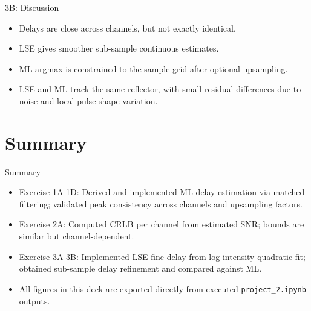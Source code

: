 \documentclass[aspectratio=169,10pt]{beamer}
\begin{document}
\begin{frame}{3B: Discussion}
\begin{itemize}
\item Delays are close across channels, but not exactly identical.
\item LSE gives smoother sub-sample continuous estimates.
\item ML argmax is constrained to the sample grid after optional upsampling.
\item LSE and ML track the same reflector, with small residual differences due to noise and local pulse-shape variation.
\end{itemize}
\end{frame}

\section*{Summary}

\begin{frame}{Summary}
\begin{itemize}
\item Exercise 1A-1D: Derived and implemented ML delay estimation via matched filtering; validated peak consistency across channels and upsampling factors.
\item Exercise 2A: Computed CRLB per channel from estimated SNR; bounds are similar but channel-dependent.
\item Exercise 3A-3B: Implemented LSE fine delay from log-intensity quadratic fit; obtained sub-sample delay refinement and compared against ML.
\item All figures in this deck are exported directly from executed \texttt{project\_2.ipynb} outputs.
\end{itemize}
\end{frame}
\end{document}
